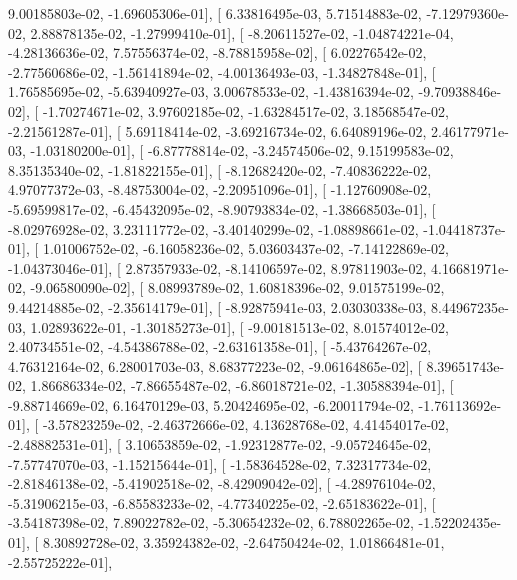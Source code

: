 \documentclass{article}
\begin{document}
          9.00185803e-02,  -1.69605306e-01],
       [  6.33816495e-03,   5.71514883e-02,  -7.12979360e-02,
          2.88878135e-02,  -1.27999410e-01],
       [ -8.20611527e-02,  -1.04874221e-04,  -4.28136636e-02,
          7.57556374e-02,  -8.78815958e-02],
       [  6.02276542e-02,  -2.77560686e-02,  -1.56141894e-02,
         -4.00136493e-03,  -1.34827848e-01],
       [  1.76585695e-02,  -5.63940927e-03,   3.00678533e-02,
         -1.43816394e-02,  -9.70938846e-02],
       [ -1.70274671e-02,   3.97602185e-02,  -1.63284517e-02,
          3.18568547e-02,  -2.21561287e-01],
       [  5.69118414e-02,  -3.69216734e-02,   6.64089196e-02,
          2.46177971e-03,  -1.03180200e-01],
       [ -6.87778814e-02,  -3.24574506e-02,   9.15199583e-02,
          8.35135340e-02,  -1.81822155e-01],
       [ -8.12682420e-02,  -7.40836222e-02,   4.97077372e-03,
         -8.48753004e-02,  -2.20951096e-01],
       [ -1.12760908e-02,  -5.69599817e-02,  -6.45432095e-02,
         -8.90793834e-02,  -1.38668503e-01],
       [ -8.02976928e-02,   3.23111772e-02,  -3.40140299e-02,
         -1.08898661e-02,  -1.04418737e-01],
       [  1.01006752e-02,  -6.16058236e-02,   5.03603437e-02,
         -7.14122869e-02,  -1.04373046e-01],
       [  2.87357933e-02,  -8.14106597e-02,   8.97811903e-02,
          4.16681971e-02,  -9.06580090e-02],
       [  8.08993789e-02,   1.60818396e-02,   9.01575199e-02,
          9.44214885e-02,  -2.35614179e-01],
       [ -8.92875941e-03,   2.03030338e-03,   8.44967235e-03,
          1.02893622e-01,  -1.30185273e-01],
       [ -9.00181513e-02,   8.01574012e-02,   2.40734551e-02,
         -4.54386788e-02,  -2.63161358e-01],
       [ -5.43764267e-02,   4.76312164e-02,   6.28001703e-03,
          8.68377223e-02,  -9.06164865e-02],
       [  8.39651743e-02,   1.86686334e-02,  -7.86655487e-02,
         -6.86018721e-02,  -1.30588394e-01],
       [ -9.88714669e-02,   6.16470129e-03,   5.20424695e-02,
         -6.20011794e-02,  -1.76113692e-01],
       [ -3.57823259e-02,  -2.46372666e-02,   4.13628768e-02,
          4.41454017e-02,  -2.48882531e-01],
       [  3.10653859e-02,  -1.92312877e-02,  -9.05724645e-02,
         -7.57747070e-03,  -1.15215644e-01],
       [ -1.58364528e-02,   7.32317734e-02,  -2.81846138e-02,
         -5.41902518e-02,  -8.42909042e-02],
       [ -4.28976104e-02,  -5.31906215e-03,  -6.85583233e-02,
         -4.77340225e-02,  -2.65183622e-01],
       [ -3.54187398e-02,   7.89022782e-02,  -5.30654232e-02,
          6.78802265e-02,  -1.52202435e-01],
       [  8.30892728e-02,   3.35924382e-02,  -2.64750424e-02,
          1.01866481e-01,  -2.55725222e-01],
\end{document}
